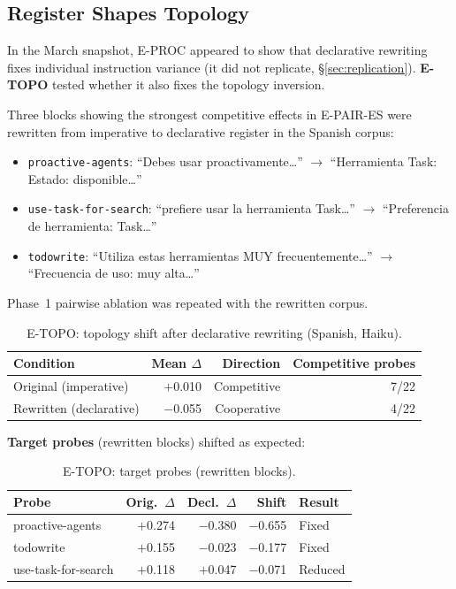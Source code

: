 \documentclass[11pt,a4paper]{article}
\begin{document}
\subsection{Register Shapes Topology}
\label{sec:etopo}

In the March snapshot, E-PROC appeared to show that declarative
rewriting fixes individual instruction variance (it did not replicate,
\S\ref{sec:replication}). \textbf{E-TOPO} tested whether it also fixes the topology
inversion.

Three blocks showing the strongest competitive effects in E-PAIR-ES
were rewritten from imperative to declarative register in the Spanish
corpus:
\begin{itemize}[nosep]
\item \texttt{proactive-agents}: ``Debes usar proactivamente\ldots''
  $\to$ ``Herramienta Task: Estado: disponible\ldots''
\item \texttt{use-task-for-search}: ``prefiere usar la herramienta
  Task\ldots'' $\to$ ``Preferencia de herramienta: Task\ldots''
\item \texttt{todowrite}: ``Utiliza estas herramientas MUY
  frecuentemente\ldots'' $\to$ ``Frecuencia de uso: muy alta\ldots''
\end{itemize}

Phase~1 pairwise ablation was repeated with the rewritten corpus.

\begin{table}[ht]
\centering
\caption{E-TOPO: topology shift after declarative rewriting (Spanish, Haiku).}
\label{tab:etopo-overall}
\begin{tabular}{lrrr}
\toprule
Condition & Mean $\Delta$ & Direction & Competitive probes \\
\midrule
Original (imperative) & $+$0.010 & Competitive & 7/22 \\
Rewritten (declarative) & $-$0.055 & Cooperative & 4/22 \\
\bottomrule
\end{tabular}
\end{table}

\textbf{Target probes} (rewritten blocks) shifted as expected:

\begin{table}[ht]
\centering
\caption{E-TOPO: target probes (rewritten blocks).}
\label{tab:etopo-targets}
\begin{tabular}{lrrrl}
\toprule
Probe & Orig.\ $\Delta$ & Decl.\ $\Delta$ & Shift & Result \\
\midrule
proactive-agents    & $+$0.274 & $-$0.380 & $-$0.655 & Fixed \\
todowrite           & $+$0.155 & $-$0.023 & $-$0.177 & Fixed \\
use-task-for-search & $+$0.118 & $+$0.047 & $-$0.071 & Reduced \\
\bottomrule
\end{tabular}
\end{table}
\end{document}
